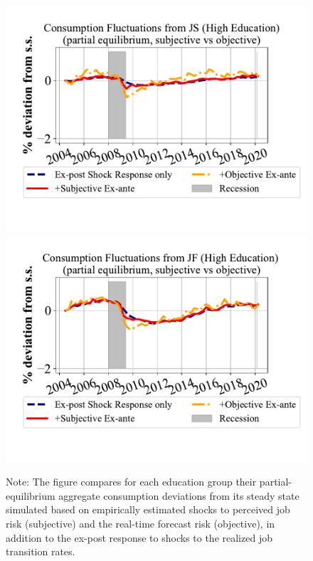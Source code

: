 \begin{figure}
\includegraphics[width=0.4\linewidth]{text/Chapter2/Figures/consumption_pe_JS_deviation_machine_as_rational_HighEdu.pdf}
\includegraphics[width=0.4\linewidth]{text/Chapter2/Figures/consumption_pe_JF_deviation_machine_as_rational_HighEdu.pdf}
      \begin{flushleft}\footnotesize {Note: The figure compares for each education group their partial-equilibrium aggregate consumption deviations from its steady state simulated based on empirically estimated shocks to perceived job risk (subjective) and the real-time forecast risk (objective), in addition to the ex-post response to shocks to the realized job transition rates.} \end{flushleft}
    \end{figure}


